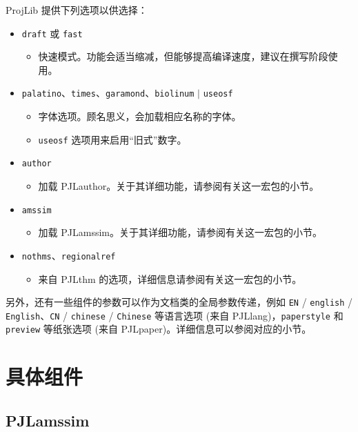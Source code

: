 \documentclass[Chinese,English,French,allowbf,puretext]{lebhart}
\providecommand{\ProjLibPackage}{\textsf{ProjLib}}
\providecommand{\PJLamssim}{\textsf{PJLamssim}}
\providecommand{\PJLauthor}{\textsf{PJLauthor}}
\providecommand{\PJLlang}{\textsf{PJLlang}}
\providecommand{\PJLpaper}{\textsf{PJLpaper}}
\providecommand{\PJLthm}{\textsf{PJLthm}}
\begin{document}
\ProjLibPackage{} 提供下列选项以供选择：
\begin{itemize}
    \item \texttt{draft} 或 \texttt{fast}
        \begin{itemize}
            \item 快速模式。功能会适当缩减，但能够提高编译速度，建议在撰写阶段使用。
        \end{itemize}
    \item \texttt{palatino}、\texttt{times}、\texttt{garamond}、\texttt{biolinum} $|$ \texttt{useosf}
        \begin{itemize}
            \item 字体选项。顾名思义，会加载相应名称的字体。
            \item \texttt{useosf} 选项用来启用“旧式”数字。
        \end{itemize}
    \item \texttt{author}
        \begin{itemize}
            \item 加载 \PJLauthor{}。关于其详细功能，请参阅有关这一宏包的小节。
        \end{itemize}
    \item \texttt{amssim}
        \begin{itemize}
            \item 加载 \PJLamssim{}。关于其详细功能，请参阅有关这一宏包的小节。
        \end{itemize}
    \item \texttt{nothms}、\texttt{regionalref}
        \begin{itemize}
            \item 来自 \PJLthm{} 的选项，详细信息请参阅有关这一宏包的小节。
        \end{itemize}
\end{itemize}
另外，还有一些组件的参数可以作为文档类的全局参数传递，例如 \texttt{EN} / \texttt{english} / \texttt{English}、\texttt{CN} / \texttt{chinese} / \texttt{Chinese} 等语言选项 (来自 \PJLlang{})，\texttt{paperstyle} 和 \texttt{preview} 等纸张选项 (来自 \PJLpaper{})。详细信息可以参阅对应的小节。

\section{具体组件}

\subsection{PJLamssim}
\end{document}
